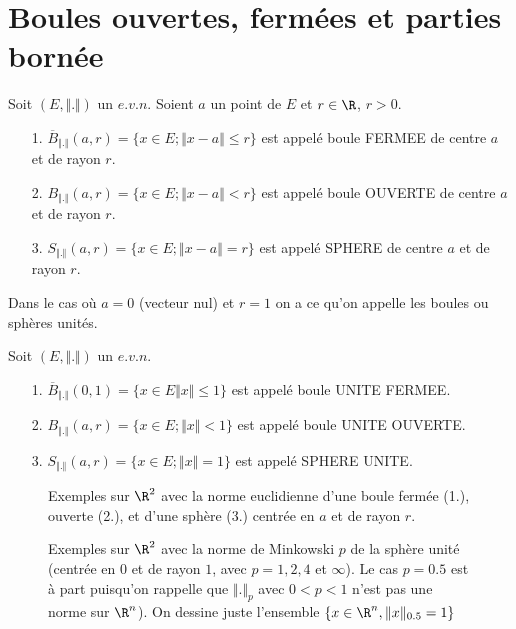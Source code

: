 \documentclass[class=report,crop=false]{standalone}
\begin{document}
\section{Boules ouvertes, fermées et parties bornée}
\begin{definition}
\textcolor[rgb]{0.73,0.00,0.00}{
\noindent  Soit $(E,\Vert . \Vert)$ un $e.v.n$. Soient $a$ un point de $E$ et $r \in \R$, $r>0$.
\begin{itemize}
\item[1.] $\overline{B}_{\Vert . \Vert}(a,r)=\lbrace x\in E; \Vert x-a \Vert \leq r\rbrace$ 
est appelé boule FERMEE de centre $a$ et de rayon $r$.
\item[2.]$B_{\Vert . \Vert}(a,r)=\lbrace x\in E; \Vert x-a \Vert < r\rbrace$ 
est appelé boule OUVERTE de centre $a$ et de rayon $r$.
\item[3.]$S_{\Vert . \Vert}(a,r)=\lbrace x\in E; \Vert x-a \Vert = r\rbrace$ 
est appelé SPHERE de centre $a$ et de rayon $r$.
\end{itemize}
 }
  \end{definition}
  
\noindent Dans le cas où $a=0$ (vecteur nul) et $r=1$ on a ce qu'on appelle les boules ou sphères unités.  
  
\begin{definition}
\textcolor[rgb]{0.73,0.00,0.00}{
\noindent  Soit $(E,\Vert . \Vert)$ un $e.v.n$.
\begin{itemize}
\item[1.] $\overline{B}_{\Vert . \Vert}(0,1)=\lbrace x\in E \Vert x \Vert \leq 1\rbrace$ 
est appelé boule UNITE FERMEE.
\item[2.]$B_{\Vert . \Vert}(a,r)=\lbrace x\in E; \Vert x \Vert < 1\rbrace$ 
est appelé boule UNITE OUVERTE.
\item[3.]$S_{\Vert . \Vert}(a,r)=\lbrace x\in E; \Vert x \Vert = 1\rbrace$ 
est appelé SPHERE UNITE.
\end{itemize}
 }
  \end{definition}
 
 \begin{figure}[!h]
    \caption{Exemples sur $\R^2$ avec la norme euclidienne d'une boule
    fermée (1.), ouverte (2.), et d'une sphère (3.) centrée en $a$ et de rayon $r$.}
      \label{fig:boules}
\end{figure}

 \begin{figure}[!h]
    \caption{Exemples sur $\R^2$ avec la norme de Minkowski $p$ de la sphère unité (centrée en $0$ et de rayon $1$,
    avec $p=1,2,4$ et $\infty$). Le cas $p=0.5$ est à part puisqu'on rappelle que $\Vert . \Vert_p$ avec $0<p<1$ n'est pas une norme sur $\R^n$). On dessine juste l'ensemble $\lbrace x \in \R^n, \Vert x \Vert_{0.5}=1 \rbrace$ }
      \label{fig:boules-p}
\end{figure}
\end{document}
